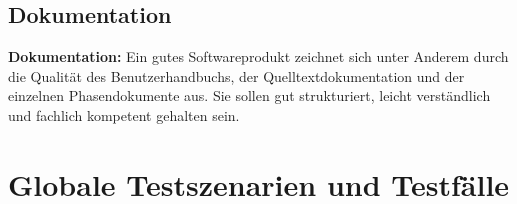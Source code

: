 \documentclass[10pt]{scrreprt}
\newcommand{\sfbf}[1]{\textbf{\sffamily #1}}
\newcommand{\ziellabel}{Z}
\newenvironment{details}[1][6pt]{%
  \parskip#1 \parindent6mm \raggedright%
  \def\item{\par\ignorespaces\hangindent=5mm \hangafter1}}{%
  \par\ignorespaces}
\begin{document}
\section*{Dokumentation}
\begin{details}
\item \sfbf{Dokumentation:} Ein gutes Softwareprodukt zeichnet sich unter Anderem durch die Qualität des Benutzerhandbuchs, der Quelltextdokumentation und der einzelnen Phasendokumente aus. Sie sollen gut strukturiert, leicht verständlich und fachlich kompetent gehalten sein. 
\end{details}




\chapter{Globale Testszenarien und Testfälle}

\renewcommand{\ziellabel}{T}
\end{document}
